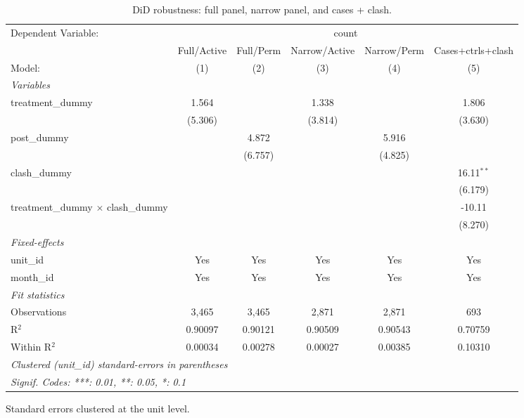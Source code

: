 \begin{table}[htbp]
   \caption{\label{tab:did_robustness} DiD robustness: full panel, narrow panel, and cases + clash.}
   \centering
   \begin{tabular}{lccccc}
      \tabularnewline \midrule \midrule
      Dependent Variable: & \multicolumn{5}{c}{count}\\
                                                & Full/Active & Full/Perm & Narrow/Active & Narrow/Perm & Cases+ctrls+clash \\   
      Model:                                    & (1)         & (2)       & (3)           & (4)         & (5)\\  
      \midrule
      \emph{Variables}\\
      treatment\_dummy                          & 1.564       &           & 1.338         &             & 1.806\\   
                                                & (5.306)     &           & (3.814)       &             & (3.630)\\   
      post\_dummy                               &             & 4.872     &               & 5.916       &   \\   
                                                &             & (6.757)   &               & (4.825)     &   \\   
      clash\_dummy                              &             &           &               &             & 16.11$^{**}$\\   
                                                &             &           &               &             & (6.179)\\   
      treatment\_dummy $\times$ clash\_dummy    &             &           &               &             & -10.11\\   
                                                &             &           &               &             & (8.270)\\   
      \midrule
      \emph{Fixed-effects}\\
      unit\_id                                  & Yes         & Yes       & Yes           & Yes         & Yes\\  
      month\_id                                 & Yes         & Yes       & Yes           & Yes         & Yes\\  
      \midrule
      \emph{Fit statistics}\\
      Observations                              & 3,465       & 3,465     & 2,871         & 2,871       & 693\\  
      R$^2$                                     & 0.90097     & 0.90121   & 0.90509       & 0.90543     & 0.70759\\  
      Within R$^2$                              & 0.00034     & 0.00278   & 0.00027       & 0.00385     & 0.10310\\  
      \midrule \midrule
      \multicolumn{6}{l}{\emph{Clustered (unit\_id) standard-errors in parentheses}}\\
      \multicolumn{6}{l}{\emph{Signif. Codes: ***: 0.01, **: 0.05, *: 0.1}}\\
   \end{tabular}
   
   \par \raggedright 
   Standard errors clustered at the unit level.
\end{table}
